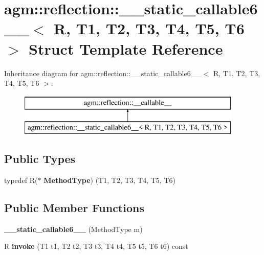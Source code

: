 \hypertarget{structagm_1_1reflection_1_1____static__callable6____}{}\section{agm\+:\+:reflection\+:\+:\+\_\+\+\_\+static\+\_\+callable6\+\_\+\+\_\+$<$ R, T1, T2, T3, T4, T5, T6 $>$ Struct Template Reference}
\label{structagm_1_1reflection_1_1____static__callable6____}
Inheritance diagram for agm\+:\+:reflection\+:\+:\+\_\+\+\_\+static\+\_\+callable6\+\_\+\+\_\+$<$ R, T1, T2, T3, T4, T5, T6 $>$\+:\begin{figure}[H]
\begin{center}
\leavevmode
\includegraphics[height=2.000000cm]{structagm_1_1reflection_1_1____static__callable6____}
\end{center}
\end{figure}
\subsection*{Public Types}
\begin{DoxyCompactItemize}
\item 
typedef R($\ast$ {\bfseries Method\+Type}) (T1, T2, T3, T4, T5, T6)\hypertarget{structagm_1_1reflection_1_1____static__callable6_____ad8d1aa3adab2f2d35b5b1388c7af1eec}{}\label{structagm_1_1reflection_1_1____static__callable6_____ad8d1aa3adab2f2d35b5b1388c7af1eec}

\end{DoxyCompactItemize}
\subsection*{Public Member Functions}
\begin{DoxyCompactItemize}
\item 
{\bfseries \+\_\+\+\_\+static\+\_\+callable6\+\_\+\+\_\+} (Method\+Type m)\hypertarget{structagm_1_1reflection_1_1____static__callable6_____abc9c968bbdda1934b6e5c4494dbb00f5}{}\label{structagm_1_1reflection_1_1____static__callable6_____abc9c968bbdda1934b6e5c4494dbb00f5}

\item 
R {\bfseries invoke} (T1 t1, T2 t2, T3 t3, T4 t4, T5 t5, T6 t6) const \hypertarget{structagm_1_1reflection_1_1____static__callable6_____aec8b360c57d84c723764cac65b0b7bab}{}\label{structagm_1_1reflection_1_1____static__callable6_____aec8b360c57d84c723764cac65b0b7bab}

\end{DoxyCompactItemize}
